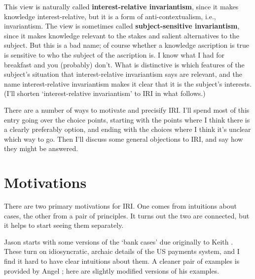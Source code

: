 This view is naturally called \textbf{interest-relative invariantism}, since it makes knowledge interest-relative, but it is a form of anti-contextualism, i.e., invariantism. The view is sometimes called \textbf{subject-sensitive invariantism}, since it makes knowledge relevant to the stakes and salient alternatives to the subject. But this is a bad name; of course whether a knowledge ascription is true is sensitive to who the subject of the ascription is. I know what I had for breakfast and you (probably) don't. What is distinctive is which features of the subject's situation that interest-relative invariantism says are relevant, and the name interest-relative invariantism makes it clear that it is the subject's interests. (I'll shorten `interest-relative invariantism' to IRI in what follows.)

There are a number of ways to motivate and precisify IRI. I'll spend most of this entry going over the choice points, starting with the points where I think there is a clearly preferably option, and ending with the choices where I think it's unclear which way to go. Then I'll discuss some general objections to IRI, and say how they might be answered.

\section{Motivations}
\label{motivations}

There are two primary motivations for IRI. One comes from intuitions about cases, the other from a pair of principles. It turns out the two are connected, but it helps to start seeing them separately.

Jason  \citet{Stanley2005} starts with some versions of the `bank cases' due originally to Keith  \citet{DeRose1992}. These turn on idiosyncratic, archaic details of the US payments system, and I find it hard to have clear intuitions about them. A cleaner pair of examples is provided by Angel  \citet{Pinillos2012}; here are slightly modified versions of his examples.

